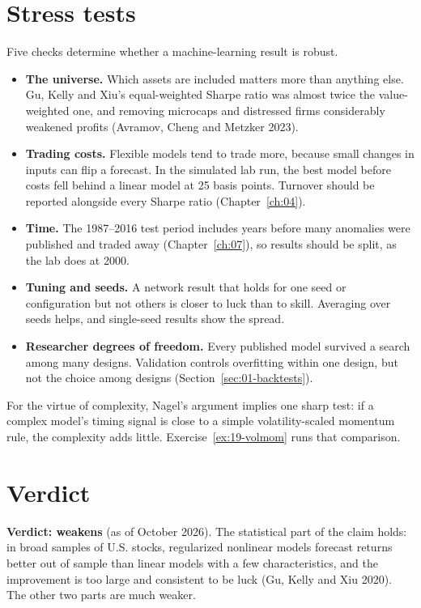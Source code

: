 \section{Stress tests}
\label{sec:19-stress}

Five checks determine whether a machine-learning result is robust.

\begin{itemize}
  \item \textbf{The universe.} Which assets are included matters more than anything else. Gu, Kelly and Xiu's equal-weighted Sharpe ratio was almost twice the value-weighted one, and removing microcaps and distressed firms considerably weakened profits (Avramov, Cheng and Metzker 2023).
  \item \textbf{Trading costs.} Flexible models tend to trade more, because small changes in inputs can flip a forecast. In the simulated lab run, the best model before costs fell behind a linear model at 25 basis points. Turnover should be reported alongside every Sharpe ratio (Chapter~\ref{ch:04}).
  \item \textbf{Time.} The 1987--2016 test period includes years before many anomalies were published and traded away (Chapter~\ref{ch:07}), so results should be split, as the lab does at 2000.
  \item \textbf{Tuning and seeds.} A network result that holds for one seed or configuration but not others is closer to luck than to skill. Averaging over seeds helps, and single-seed results show the spread.
  \item \textbf{Researcher degrees of freedom.} Every published model survived a search among many designs. Validation controls overfitting within one design, but not the choice among designs (Section~\ref{sec:01-backtests}).
\end{itemize}

For the virtue of complexity, Nagel's argument implies one sharp test: if a complex model's timing signal is close to a simple volatility-scaled momentum rule, the complexity adds little. Exercise~\ref{ex:19-volmom} runs that comparison.

\section{Verdict}
\label{sec:19-verdict}

\begin{callout}
\textbf{Verdict: weakens} (as of October 2026). The statistical part of the claim holds: in broad samples of U.S. stocks, regularized nonlinear models forecast returns better out of sample than linear models with a few characteristics, and the improvement is too large and consistent to be luck (Gu, Kelly and Xiu 2020). The other two parts are much weaker.
\end{callout}

